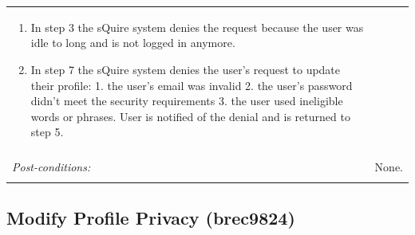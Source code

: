\documentclass[11pt]{report}
\begin{document}
\begin{tabular}{ p{2cm} p{12cm} }
\begin{enumerate}
  \item In step 3 the sQuire system denies the request because the user was idle to long and is not logged in anymore. 
  \item In step 7 the sQuire system denies the user's request to update their profile: 1. the user's email was invalid 
  2. the user's password didn't meet the security requirements 3. the user used ineligible words or phrases. User is notified of the denial and is returned to step 5.
 \end{enumerate} \\
 \\
 \textit{Post-conditions:} & None. \\
 \\
\hline
\end{tabular}

\subsection{Modify Profile Privacy (brec9824)}
\end{document}
